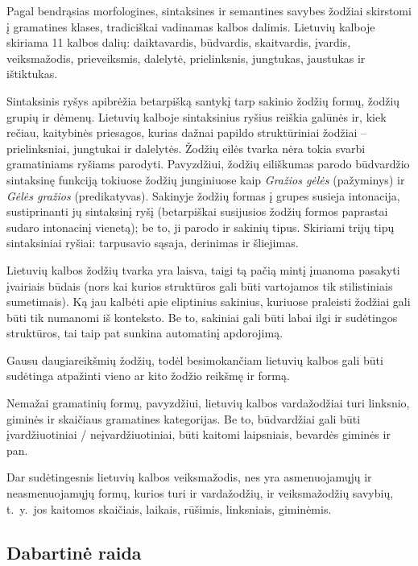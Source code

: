 \documentclass[]{../metanetpaper}
\begin{document}
\begin{multicols}{2}
Pagal bendrąsias morfologines, sintaksines ir semantines savybes žodžiai skirstomi į gramatines klases, tradiciškai vadinamas kalbos dalimis. Lietuvių kalboje skiriama 11 kalbos dalių: daiktavardis, būdvardis, skaitvardis, įvardis, veiksmažodis, prieveiksmis, dalelytė, prielinksnis, jungtukas, jaustukas ir ištiktukas.

Sintaksinis ryšys apibrėžia betarpišką santykį tarp sakinio žodžių formų, žodžių grupių ir dėmenų. Lietuvių kalboje sintaksinius ryšius reiškia galūnės ir, kiek rečiau, kaitybinės priesagos, kurias dažnai papildo struktūriniai žodžiai – prielinksniai, jungtukai ir dalelytės. Žodžių eilės tvarka nėra tokia svarbi gramatiniams ryšiams parodyti. Pavyzdžiui, žodžių eiliškumas parodo būdvardžio sintaksinę funkciją tokiuose žodžių junginiuose kaip  \textit{Gražios gėlės} (pažyminys) ir  \textit{Gėlės gražios} (predikatyvas). Sakinyje žodžių formas į grupes susieja intonacija, sustiprinanti jų sintaksinį ryšį (betarpiškai susijusios žodžių formos paprastai sudaro intonacinį vienetą); be to, ji parodo ir sakinių tipus. Skiriami trijų tipų sintaksiniai ryšiai: tarpusavio sąsaja, derinimas ir šliejimas.

Lietuvių kalbos žodžių tvarka yra laisva, taigi tą pačią mintį įmanoma pasakyti įvairiais būdais (nors kai kurios struktūros gali būti vartojamos tik stilistiniais sumetimais). Ką jau kalbėti apie eliptinius sakinius, kuriuose praleisti žodžiai gali būti tik numanomi iš konteksto. Be to, sakiniai gali būti labai ilgi ir sudėtingos struktūros, tai taip pat sunkina automatinį apdorojimą.

Gausu daugiareikšmių žodžių, todėl besimokančiam lietuvių kalbos gali būti sudėtinga atpažinti vieno ar kito žodžio reikšmę ir formą.

Nemažai gramatinių formų, pavyzdžiui, lietuvių kalbos vardažodžiai turi linksnio, giminės ir skaičiaus gramatines kategorijas. Be to, būdvardžiai gali būti įvardžiuotiniai / neįvardžiuotiniai, būti kaitomi laipsniais, bevardės giminės ir pan.

Dar sudėtingesnis lietuvių kalbos veiksmažodis, nes yra asmenuojamųjų ir neasmenuojamųjų formų, kurios turi ir vardažodžių, ir veiksmažodžių savybių, t.~y.~jos kaitomos skaičiais, laikais, rūšimis, linksniais, giminėmis.


\subsection{Dabartinė raida}


\end{multicols}
\end{document}
